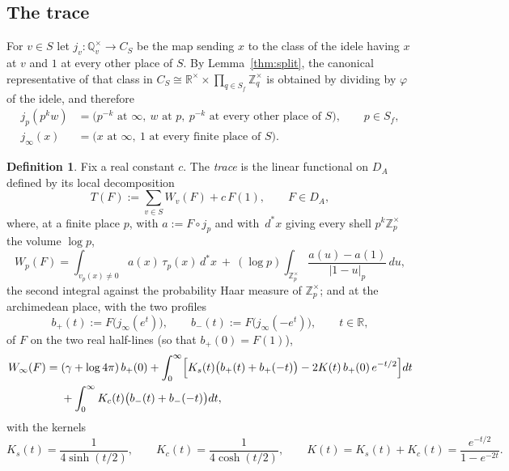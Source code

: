 \documentclass[11pt]{amsart}
\theoremstyle{definition}
\newtheorem{definition}[theorem]{Definition}
\theoremstyle{remark}
\newcommand{\R}{\mathbb R}
\newcommand{\Z}{\mathbb Z}
\newcommand{\Q}{\mathbb Q}
\newcommand{\dstar}{\,d^{*}}
\newcommand{\DA}{D_A}
\begin{document}
\subsection{The trace}

For $v\in S$ let $j_v:\Q_v^{\times}\to C_S$ be the map sending $x$ to the class
of the idele having $x$ at $v$ and $1$ at every other place of $S$.  By
Lemma~\ref{thm:split}, the canonical representative of that class in
$C_S\cong\R^{\times}\times\prod_{q\in S_f}\Z_q^{\times}$ is obtained by
dividing by $\varphi$ of the idele, and therefore
\begin{equation}\label{eq:slices}
\begin{aligned}
j_p(p^{k}w)&=\bigl(p^{-k}\text{ at }\infty,\ w\text{ at }p,\
p^{-k}\text{ at every other place of }S\bigr),\qquad p\in S_f,\\
j_{\infty}(x)&=\bigl(x\text{ at }\infty,\ 1\text{ at every finite place of }S
\bigr).
\end{aligned}
\end{equation}

\begin{definition}\label{def:trace}
Fix a real constant $c$.  The \emph{trace} is the linear functional on $\DA$
defined by its local decomposition
\begin{equation}\label{eq:tracedef}
T(F):=\sum_{v\in S}W_v(F)+c\,F(1),\qquad F\in\DA ,
\end{equation}
where, at a finite place $p$, with $a:=F\circ j_p$ and with $\dstar x$ giving
every shell $p^{k}\Z_p^{\times}$ the volume $\log p$,
\begin{equation}\label{eq:Wp}
W_p(F)=\int_{v_p(x)\neq0}a(x)\,\tau_p(x)\dstar x
\ +\ (\log p)\int_{\Z_p^{\times}}\frac{a(u)-a(1)}{|1-u|_p}\,du,
\end{equation}
the second integral against the probability Haar measure of
$\Z_p^{\times}$; and at the archimedean place, with the two profiles
\[
b_{+}(t):=F\bigl(j_{\infty}(e^{t})\bigr),\qquad
b_{-}(t):=F\bigl(j_{\infty}(-e^{t})\bigr),\qquad t\in\R,
\]
of $F$ on the two real half-lines (so that $b_{+}(0)=F(1)$),
\begin{equation}\label{eq:Winf}
\begin{aligned}
W_{\infty}(F)={}&(\gamma+\log4\pi)\,b_{+}(0)
+\int_0^{\infty}\Bigl[K_{s}(t)\bigl(b_{+}(t)+b_{+}(-t)\bigr)
-2K(t)\,b_{+}(0)\,e^{-t/2}\Bigr]dt\\
&+\int_0^{\infty}K_{c}(t)\bigl(b_{-}(t)+b_{-}(-t)\bigr)dt,
\end{aligned}
\end{equation}
with the kernels
\[
K_{s}(t)=\frac{1}{4\sinh(t/2)},\qquad K_{c}(t)=\frac{1}{4\cosh(t/2)},\qquad
K(t)=K_{s}(t)+K_{c}(t)=\frac{e^{-t/2}}{1-e^{-2t}} .
\]
\end{definition}
\end{document}
